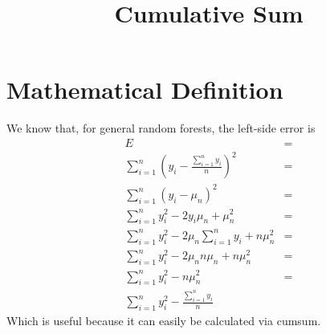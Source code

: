 \documentclass{article}
\begin{document}
\title{Cumulative Sum}
\author{}
\date{}

\maketitle

\section{Mathematical Definition}
We know that, for general random forests, the left-side error is 
\begin{align*}
    E &= \\
    \sum_{i = 1}^{n} (y_i - \frac{\sum_{i = 1}^{n} y_i}{n})^2 &= \\
    \sum_{i = 1}^{n} (y_i - \mu_n)^2 &= \\
    \sum_{i = 1}^{n} y_i^2 - 2y_i \mu_n + \mu_n^2  &= \\
    \sum_{i = 1}^{n} y_i^2 - 2\mu_n \sum_{i = 1}^{n} y_i + n\mu_n^2 &= \\
    \sum_{i = 1}^{n} y_i^2 - 2\mu_n n\mu_n + n\mu_n^2 &= \\
    \sum_{i = 1}^{n} y_i^2 - n\mu_n^2 &= \\
    \sum_{i = 1}^{n} y_i^2 - \frac{\sum_{i=1}^n y_i}{n}
\end{align*}
Which is useful because it can easily be calculated via cumsum.
\end{document}
